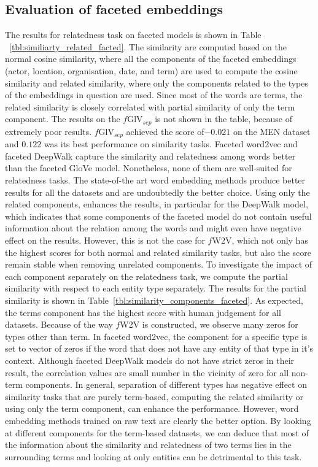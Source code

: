 \subsection{Evaluation of faceted embeddings}\label{subsec:eval_faceted}
The results for relatedness task on faceted models is shown in Table ~\ref{tbl:similiarty_related_facted}. The similarity are computed based on the normal cosine similarity, where all the components of the faceted embeddings (actor, location, organisation, date, and term) are used to compute the cosine similarity and related similarity, where only the components related to the types of the embeddings in question are used. Since most of the words are terms, the related similarity is closely correlated with partial similarity of only the term component. The results on the $f$GlV$_{sep}$ is not shown in the table, because of extremely poor results.  $f$GlV$_{sep}$ achieved the score of$-0.021$ on the MEN dataset and $0.122$ was its best performance on similarity tasks. Faceted word2vec and faceted DeepWalk capture the similarity and relatedness among words better than the faceted GloVe model. Nonetheless, none of them are well-suited for relatedness tasks. The state-of-the art word embedding methods produce better results for all the datasets and are undoubtedly the better choice. Using only the related components, enhances the results, in particular for the DeepWalk model, which indicates that some components of the faceted model do not contain useful information about the relation among the words and might even have negative effect on the results. However, this is not the  case for $f$W2V, which not only has the highest scores for both normal and related similarity tasks, but also the score remain stable when removing unrelated components. To investigate the impact of each component separately on the relatedness task, we compute the partial similarity with respect to each entity type separately. The results for the partial similarity is shown in Table~\ref{tbl:similarity_components_faceted}. As expected, the terms component has the highest score with human judgement for all datasets. Because of the way $f$W2V is constructed, we observe many zeros for types other than term. In faceted word2vec, the component for a specific type is set to vector of zeros if the word that does not have any entity of that type in it's context. Although faceted DeepWalk models do not have strict zeros in their result, the correlation values are small number in the vicinity of zero for all non-term components. In general, separation of different types has negative effect on similarity tasks that are purely term-based, computing the related similarity or using only the term component, can enhance the performance. However, word embedding methods trained on raw text are clearly the better option. By looking at different components for the term-based datasets, we can deduce that most of the information about the similarity and relatedness of two terms lies in the surrounding terms and looking at only entities can be detrimental to this task. \\ 
